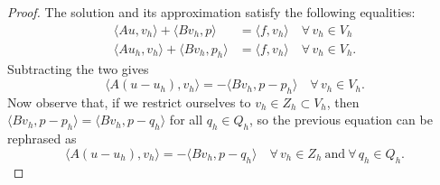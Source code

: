 \begin{proof}
	The solution and its approximation satisfy the following equalities:
	\begin{align*}
	    \langle Au,v_h\rangle+\langle Bv_h,p\rangle&=\langle f,v_h\rangle \quad \forall\,v_h\in V_h\\
	    \langle Au_h,v_h\rangle+\langle Bv_h,p_h\rangle&=\langle f,v_h\rangle \quad \forall\,v_h\in V_h.
	\end{align*}
	Subtracting the two gives
	\begin{equation}\label{eqn:mixed-remainder}
	    \langle A(u-u_h),v_h\rangle=-\langle Bv_h,p-p_h\rangle \quad \forall\, v_h\in V_h.
	\end{equation}
	Now observe that, if we restrict ourselves to $v_h\in Z_h\subset V_h$, then $\langle Bv_h,p-p_h\rangle=\langle Bv_h,p-q_h\rangle$ for all $q_h\in Q_h$, so the previous equation can be rephrased as
	\begin{equation}\label{eqn:mixed prb orthogonality}
	    \langle A(u-u_h),v_h\rangle=-\langle Bv_h,p-q_h\rangle \quad \forall\, v_h\in Z_h \ \text{and} \ \forall\,q_h\in Q_h.
	\end{equation}
	

\end{proof}
